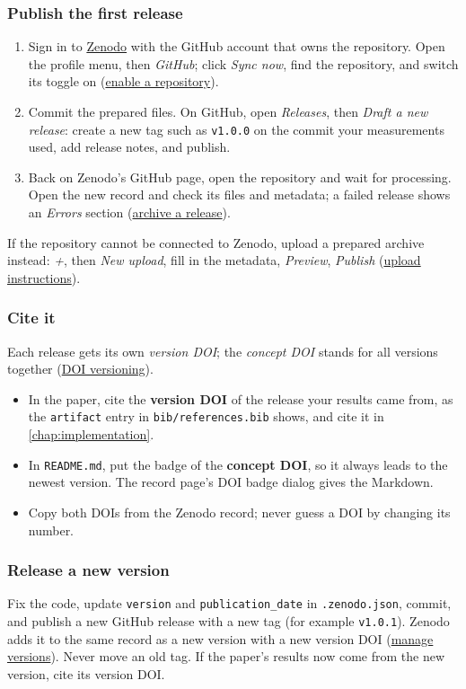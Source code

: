 \subsubsection{Publish the first release}
\begin{enumerate}
  \item Sign in to \href{https://zenodo.org/}{Zenodo} with the GitHub account that owns the repository. Open the profile menu, then \emph{GitHub}; click \emph{Sync now}, find the repository, and switch its toggle on (\href{https://help.zenodo.org/docs/github/enable-repository/}{enable a repository}).
  \item Commit the prepared files. On GitHub, open \emph{Releases}, then \emph{Draft a new release}: create a new tag such as \texttt{v1.0.0} on the commit your measurements used, add release notes, and publish.
  \item Back on Zenodo's GitHub page, open the repository and wait for processing. Open the new record and check its files and metadata; a failed release shows an \emph{Errors} section (\href{https://help.zenodo.org/docs/github/archive-software/github-upload/}{archive a release}).
\end{enumerate}
If the repository cannot be connected to Zenodo, upload a prepared archive instead: \emph{+}, then \emph{New upload}, fill in the metadata, \emph{Preview}, \emph{Publish} (\href{https://help.zenodo.org/docs/deposit/create-new-upload/}{upload instructions}).

\subsubsection{Cite it}
Each release gets its own \emph{version DOI}; the \emph{concept DOI} stands for all versions together (\href{https://support.zenodo.org/help/en-gb/1-upload-deposit/97-what-is-doi-versioning}{DOI versioning}).
\begin{itemize}
  \item In the paper, cite the \textbf{version DOI} of the release your results came from, as the \texttt{artifact} entry in \texttt{bib/references.bib} shows, and cite it in \cref{chap:implementation}.
  \item In \texttt{README.md}, put the badge of the \textbf{concept DOI}, so it always leads to the newest version. The record page's DOI badge dialog gives the Markdown.
  \item Copy both DOIs from the Zenodo record; never guess a DOI by changing its number.
\end{itemize}

\subsubsection{Release a new version}
Fix the code, update \texttt{version} and \texttt{publication\_date} in \texttt{.zenodo.json}, commit, and publish a new GitHub release with a new tag (for example \texttt{v1.0.1}). Zenodo adds it to the same record as a new version with a new version DOI (\href{https://help.zenodo.org/docs/deposit/manage-versions/}{manage versions}). Never move an old tag. If the paper's results now come from the new version, cite its version DOI.
